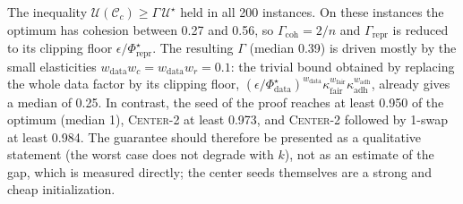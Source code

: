 \documentclass[10pt]{article}
\theoremstyle{remark}
\theoremstyle{definition}
\newcommand{\C}{\mathcal{C}}
\begin{document}
The inequality $\mathcal{U}(\C_c) \ge \Gamma\,\mathcal{U}^\star$ held in all 200 instances. On these instances the
optimum has cohesion between 0.27 and 0.56, so $\Gamma_{\text{coh}} = 2/n$ and $\Gamma_{\text{repr}}$ is reduced to its
clipping floor $\epsilon/\Phi^\star_{\text{repr}}$. The resulting $\Gamma$ (median 0.39) is driven mostly by the small
elasticities $w_{\text{data}} w_c = w_{\text{data}} w_r = 0.1$: the trivial bound obtained by replacing the whole data
factor by its clipping floor, $(\epsilon/\Phi^\star_{\text{data}})^{w_{\text{data}}}\kappa_{\text{fair}}^{w_{\text{fair}}}
\kappa_{\text{adh}}^{w_{\text{adh}}}$, already gives a median of 0.25. In contrast, the seed of the proof reaches at
least 0.950 of the optimum (median 1), \textsc{Center-2} at least 0.973, and \textsc{Center-2} followed by 1-swap at least
0.984. The guarantee should therefore be presented as a qualitative statement (the worst case does not degrade with
$k$), not as an estimate of the gap, which is measured directly; the center seeds themselves are a strong and cheap
initialization.
\end{document}
